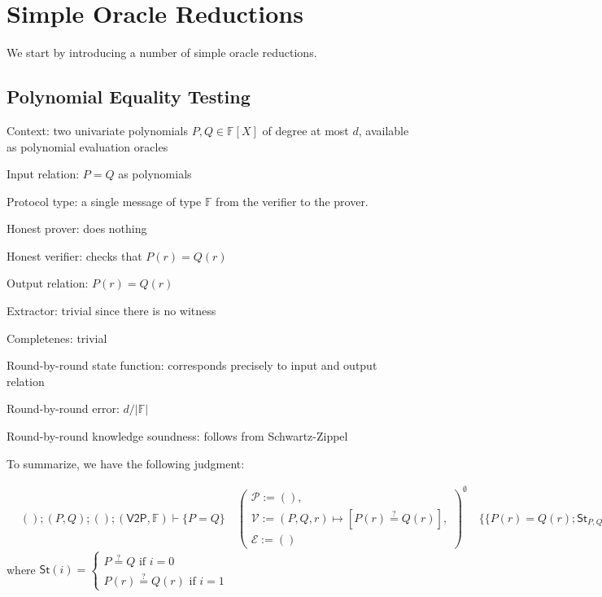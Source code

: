 \section{Simple Oracle Reductions}

We start by introducing a number of simple oracle reductions.

\subsection{Polynomial Equality Testing}

Context: two univariate polynomials $P, Q \in \mathbb{F}[X]$ of degree at most $d$, available as polynomial evaluation oracles

Input relation: $P = Q$ as polynomials

Protocol type: a single message of type $\mathbb{F}$ from the verifier to the prover.

Honest prover: does nothing

Honest verifier: checks that $P(r) = Q(r)$

Output relation: $P(r) = Q(r)$

Extractor: trivial since there is no witness

Completenes: trivial

Round-by-round state function: corresponds precisely to input and output relation

\newcommand{\abs}[1]{\lvert #1 \rvert}

Round-by-round error: $d / \abs{\mathbb{F}}$

Round-by-round knowledge soundness: follows from Schwartz-Zippel

To summarize, we have the following judgment:

\begin{align*}
    & (); (P, Q); (); (\mathsf{V2P}, \mathbb{F}) \vdash \{P = Q\} \quad \left(
    \begin{array}{l}
        \mathcal{P} := (), \\
        \mathcal{V} := (P,Q,r) \mapsto [P(r) \stackrel{?}{=} Q(r)], \\
        \mathcal{E} := ()
    \end{array}
    \right)^{\emptyset} \quad \{\!\{P(r) = Q(r); \mathsf{St}_{P,Q}; \frac{d}{\abs{\mathbb{F}}}\}\!\}
\end{align*}
where $\mathsf{St}(i) = \begin{cases} P \stackrel{?}{=} Q \text{ if } i = 0 \\ P(r) \stackrel{?}{=} Q(r) \text{ if } i = 1 \end{cases}$

